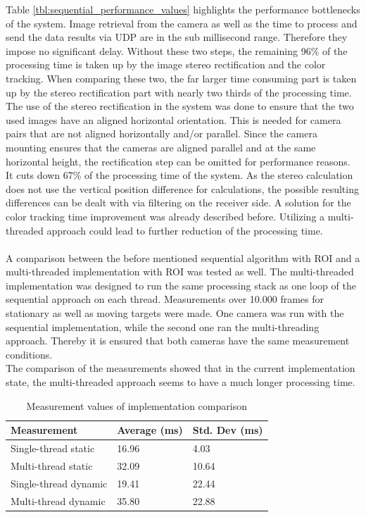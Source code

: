 Table \ref{tbl:sequential_performance_values} highlights the performance bottlenecks of the system. Image retrieval from the camera as well as the time to process and send the data results via UDP are in the sub millisecond range. Therefore they impose no significant delay. Without these two steps, the remaining 96\% of the processing time is taken up by the image stereo rectification and the color tracking. When comparing these two, the far larger time consuming part is taken up by the stereo rectification part with nearly two thirds of the processing time.\\
The use of the stereo rectification in the system was done to ensure that the two used images have an aligned horizontal orientation. This is needed for camera pairs that are not aligned horizontally and/or parallel. Since the camera mounting ensures that the cameras are aligned parallel and at the same horizontal height, the rectification step can be omitted for performance reasons. It cuts down 67\% of the processing time of the system. As the stereo calculation does not use the vertical position difference for calculations, the possible resulting differences can be dealt with via filtering on the receiver side.
A solution for the color tracking time improvement was already described before. Utilizing a multi-threaded approach could lead to further reduction of the processing time.\\\\ A comparison between the before mentioned sequential algorithm with ROI and a multi-threaded implementation with ROI was tested as well. The multi-threaded implementation was designed to run the same processing stack as one loop of the sequential approach on each thread. Measurements over 10.000 frames for stationary as well as moving targets were made. One camera was run with the sequential implementation, while the second one ran the multi-threading approach. Thereby it is ensured that both cameras have the same measurement conditions.\\
The comparison of the measurements showed that in the current implementation state, the multi-threaded approach seems to have a much longer processing time. 
\begin{table}[h]
\centering
\caption{Measurement values of implementation comparison}
\label{tbl:implementaion_comparison}
\begin{tabular}{|l|l|l|}
\hline
Measurement            & Average (ms) & Std. Dev (ms) \\ \hline
Single-thread static  & 16.96        & 4.03          \\ \hline
Multi-thread static   & 32.09        & 10.64         \\ \hline
Single-thread dynamic & 19.41        & 22.44         \\ \hline
Multi-thread dynamic  & 35.80        & 22.88         \\ \hline
\end{tabular}
\end{table}
